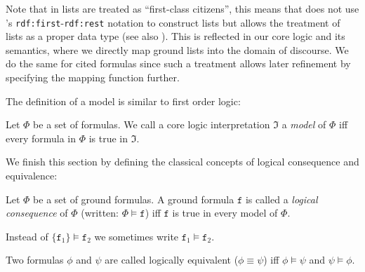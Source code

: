Note that in \nthree lists are treated as ``first-class citizens'', this means that \nthree does not use \rdf's 
\texttt{rdf:first}-\texttt{rdf:rest} notation to construct lists but allows the treatment of lists as a proper data type (see also \cite[p.6]{N3Logic}). 
This is reflected
in our core logic and its semantics, where we directly map ground lists into the domain of discourse. We do the same for cited formulas since such a treatment allows later
refinement by specifying the mapping function further. %


The definition of a model is similar to first order logic:


\begin{definition}[Model]
 Let $\Phi$ be a set of formulas. We call a core logic interpretation $\mathfrak{I}$ a \emph{model} of $\Phi$ iff every formula in $\Phi$ is true in $\mathfrak{I}$.
\end{definition}


We finish this section by defining the classical concepts of logical consequence and equivalence:

\begin{definition}
 Let $\Phi$ be a set of ground formulas. A ground formula $\texttt{f}$ is called a \emph{logical consequence} of $\Phi$ (written: $\Phi\models\texttt{f}$) 
 iff $\texttt{f}$ is true in every model 
 of $\Phi$.
\end{definition}
 Instead of $\{\texttt{f}_1\}\models \texttt{f}_2$ we sometimes write $\texttt{f}_1\models\texttt{f}_2$.

\begin{definition}
 Two formulas $\phi$ and $\psi$ are called logically equivalent ($\phi \equiv \psi$) iff $\phi \models \psi$ and $\psi\models \phi$.
\end{definition}

